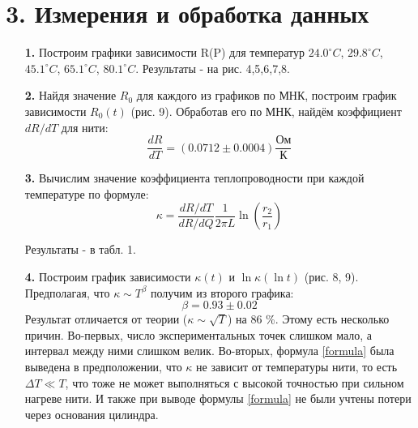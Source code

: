 \documentclass[a4paper,12pt]{article} %
\begin{document}
\section*{3. Измерения и обработка данных}
\begin{itemize}
\item[\textbf{1. }]Построим графики зависимости R(P) для температур $24.0^{\circ} C$, \; $29.8^{\circ} C$, \; $45.1^{\circ} C$, \; $65.1^{\circ} C$, \; $80.1^{\circ} C$. Результаты - на рис. 4,5,6,7,8.
\item[\textbf{2. }] Найдя значение $R_0$ для каждого из графиков по МНК, построим график зависимости $R_0(t)$ (рис. 9). Обработав его по МНК, найдём коэффициент $dR/dT$ для нити:
\[\frac{dR}{dT} = (0.0712 \pm 0.0004) \frac{\text{Ом}}{\text{К}} \]
\item[\textbf{3. }] Вычислим значение коэффициента теплопроводности при каждой температуре по формуле:
\begin{equation}\label{formula}
\kappa = \frac{dR/dT}{dR/dQ}  \frac{1}{2\pi L} \ln{\left(\frac{r_2}{r_1}\right)}
\end{equation}

Результаты - в табл. 1.
\item[\textbf{4. }] Построим график зависимости $\kappa(t)$ и $\ln{\kappa} (\ln{t})$ (рис. 8, 9). Предполагая, что $\kappa \sim T^{\beta}$ получим из второго графика:
\[\beta = 0.93 \pm 0.02 \]
Результат отличается от теории ($\kappa \sim \sqrt{T}$) на 86 \%. Этому есть несколько причин. Во-первых, число экспериментальных точек слишком мало, а интервал между ними слишком велик. Во-вторых, формула \eqref{formula} была выведена в предположении, что $\kappa$ не зависит от температуры нити, то есть $\Delta T \ll T$, что тоже не может выполняться с высокой точностью при сильном нагреве нити. И также при выводе формулы \eqref{formula} не были учтены потери через основания цилиндра.
\end{itemize}

	
\noindent
\end{document}
